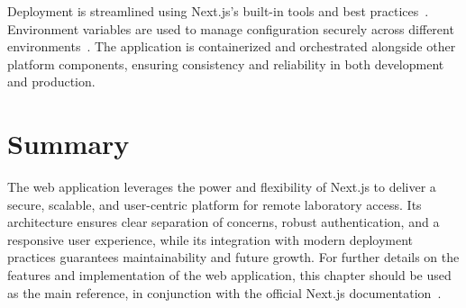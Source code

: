 Deployment is streamlined using Next.js's built-in tools and best practices~\cite{nextjs-deployment}. Environment variables are used to manage configuration securely across different environments~\cite{nextjs-env-vars}. The application is containerized and orchestrated alongside other platform components, ensuring consistency and reliability in both development and production.

\section{Summary}

The web application leverages the power and flexibility of Next.js to deliver a secure, scalable, and user-centric platform for remote laboratory access. Its architecture ensures clear separation of concerns, robust authentication, and a responsive user experience, while its integration with modern deployment practices guarantees maintainability and future growth. For further details on the features and implementation of the web application, this chapter should be used as the main reference, in conjunction with the official Next.js documentation~\cite{nextjs-docs}. 